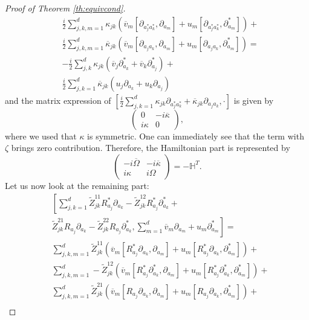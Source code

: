 \documentclass[preprint]{elsarticle}
\theoremstyle{definition}
\begin{document}
\begin{proof}[Proof of Theorem \ref{th:equivcond}]
\[\begin{split}
        &\frac{i}{2}\sum_{j,k,m=1}^{d}\kappa_{jk}(\overline{v}_m[\partial_{a_j^*a^*_k},\partial_{a_m}]+u_m[\partial_{a_j^*a^*_k},\partial^*_{a_m}])+\\
        &\frac{i}{2}\sum_{j,k,m=1}^{d}\overline{\kappa}_{jk}(\overline{v}_m[\partial_{a_ja_k},\partial_{a_m}]+u_m[\partial_{a_ja_k},\partial^*_{a_m}])=\\
        &-\frac{i}{2}\sum_{j,k}^{d}\kappa_{jk}(\overline{v}_j\partial_{a_k}^*+\overline{v}_k\partial^*_{a_j})+\\
        &\frac{i}{2}\sum_{j,k=1}^{d}\overline{\kappa}_{jk}(u_j\partial_{a_k}+u_k \partial_{a_j})
    \end{split}\]
    and the matrix expression of $ \left [\frac{i}{2}\sum_{j,k=1}^{d}\kappa_{jk} \partial_{a_j^*a^*_k}+\overline{\kappa}_{jk} \partial_{a_ja_k},\cdot \right ]$ is given by
    $$\begin{pmatrix} 0 & -i\overline{\kappa}\\
    i\kappa & 0
        \end{pmatrix},$$
        where we used that $\kappa$ is symmetric. One can immediately see that the term with $\zeta$ brings zero contribution. Therefore, the Hamiltonian part is represented by
        $$\begin{pmatrix} -i\overline{\Omega} & -i\overline{\kappa}\\
    i\kappa & i\Omega
        \end{pmatrix}=-\mathbb{H}^T.$$
    Let us now look at the remaining part:
    \begin{equation}\label{eq:ztildecomm}\begin{split}
        &\left [ \sum_{j,k=1}^{d} \widetilde{Z}^{11}_{jk}R^*_{a_j}\partial_{a_k}-\widetilde{Z}^{12}_{jk}R^*_{a_j}\partial^*_{a_k}+\right .\\
        &\left .\widetilde{Z}^{21}_{jk}R_{a_j}\partial_{a_k}-\widetilde{Z}^{22}_{jk}R_{a_j}\partial^*_{a_k},\sum_{m=1}^{d}\overline{v}_m\partial_{a_m}+u_m\partial_{a_m}^*\right ]=\\
        &\sum_{j,k,m=1}^{d} \widetilde{Z}^{11}_{jk}(\overline{v}_m[R_{a_j}^*\partial_{a_k},\partial_{a_m}]+u_m[R_{a_j}^*\partial_{a_k},\partial^*_{a_m}])+\\
        &\sum_{j,k,m=1}^{d} -\widetilde{Z}^{12}_{jk}(\overline{v}_m[R_{a_j}^*\partial^*_{a_k},\partial_{a_m}]+u_m[R_{a_j}^*\partial^*_{a_k},\partial^*_{a_m}])+\\
        &\sum_{j,k,m=1}^{d} \widetilde{Z}^{21}_{jk}(\overline{v}_m[R_{a_j}\partial_{a_k},\partial_{a_m}]+u_m[R_{a_j}\partial_{a_k},\partial^*_{a_m}])+\\

\end{split}
\end{equation}
\end{proof}
\end{document}
